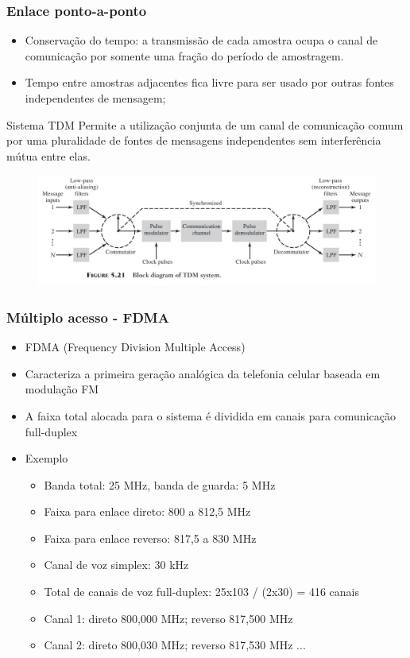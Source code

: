 \begin{frame}
	\frametitle{Enlace ponto-a-ponto}

	\begin{itemize}
	 \item Conservação do tempo: a transmissão de cada amostra ocupa o canal de comunicação por somente uma fração do período de amostragem.
         \item Tempo entre amostras adjacentes fica livre para ser usado por outras fontes independentes de mensagem;
	\end{itemize}
	\begin{block}{Sistema TDM}
	    Permite a utilização conjunta de um canal de comunicação comum por uma pluralidade de fontes de mensagens independentes sem interferência mútua entre elas.
	\end{block}
	\begin{figure}
	  \begin{center}
	    \includegraphics[width=0.9\columnwidth]{figs/fig05-21}
	  \end{center}
	\end{figure}
\end{frame}

\begin{frame}
 	\frametitle{Múltiplo acesso - FDMA}
 
	\begin{itemize}
		\item FDMA (Frequency Division Multiple Access)
		\item Caracteriza a primeira geração analógica da telefonia celular baseada em modulação FM
		\item A faixa total alocada para o sistema é dividida em canais para comunicação full-duplex
		\item Exemplo
		\begin{itemize}
			\item Banda total: 25 MHz, banda de guarda: 5 MHz
			\item Faixa para enlace direto: 800 a 812,5 MHz
			\item Faixa para enlace reverso: 817,5 a 830 MHz
			\item Canal de voz simplex: 30 kHz
			\item Total de canais de voz full-duplex: 25x103 / (2x30) = 416 canais
			\item Canal 1: direto 800,000 MHz; reverso 817,500 MHz
			\item Canal 2: direto 800,030 MHz; reverso 817,530 MHz ...
		\end{itemize}

	\end{itemize}
 \end{frame}
 
